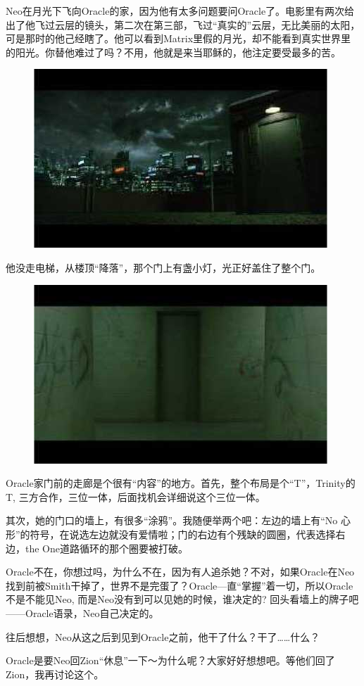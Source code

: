 \documentclass[UTF8]{ctexart}
\begin{document}
Neo在月光下飞向Oracle的家，因为他有太多问题要问Oracle了。电影里有两次给出了他飞过云层的镜头，第二次在第三部，飞过“真实的”云层，无比美丽的太阳，可是那时的他己经瞎了。他可以看到Matrix里假的月光，却不能看到真实世界里的阳光。你替他难过了吗？不用，他就是来当耶稣的，他注定要受最多的苦。

\begin{figure}[htb]
\centering
\includegraphics[width=0.5\linewidth]{fig/read_reloaded-28}
\end{figure}

他没走电梯，从楼顶“降落”，那个门上有盏小灯，光正好盖住了整个门。

\begin{figure}[htb]
\centering
\includegraphics[width=0.5\linewidth]{fig/read_reloaded-29}
\end{figure}

Oracle家门前的走廊是个很有“内容”的地方。首先，整个布局是个“T”，Trinity的T, 三方合作，三位一体，后面找机会详细说这个三位一体。

其次，她的门口的墙上，有很多“涂鸦”。我随便举两个吧：左边的墙上有“No 心形”的符号，在说选左边就没有爱情啦；门的右边有个残缺的圆圈，代表选择右边，the One道路循环的那个圈要被打破。

Oracle不在，你想过吗，为什么不在，因为有人追杀她？不对，如果Oracle在Neo找到前被Smith干掉了，世界不是完蛋了？Oracle—直“掌握”着一切，所以Oracle不是不能见Neo, 而是Neo没有到可以见她的时候，谁决定的? 回头看墙上的牌子吧——Oracle语录，Neo自己决定的。

往后想想，Neo从这之后到见到Oracle之前，他干了什么？干了……什么？

Oracle是要Neo回Zion“休息”一下～为什么呢？大家好好想想吧。等他们回了Zion，我再讨论这个。
\end{document}
